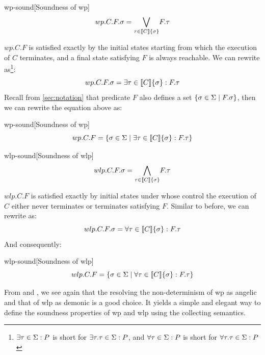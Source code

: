 \begin{theorem}{wp-sound}[Soundness of wp]~{\normalfont\cite{zhang22}} 
\ \vspace{-1.5mm}  
\[
wp.C.F.\sigma = \underset{\tau\in\sem{C}\{\sigma\}}{\bigvee} F.\tau
\]
\end{theorem}

$wp.C.F$ is satisfied exactly by the initial states starting from which the execution of $C$ terminates, and a final state satisfying $F$ is always reachable.
We can rewrite  as\footnote{$\exists\tau\in\S:P$ is short for $\exists\tau.\tau\in\S:P$, and $\forall\tau\in\S:P$ is short for $\forall\tau.\tau\in\S:P$}: 
\[wp.C.F.\sigma = \exists \tau\in\sem{C}\{\sigma\}: F.\tau \]
Recall from \autoref{sec:notation} that predicate $F$ also defines a set $\{\sigma\in\S\mid F.\sigma\}$, then we can rewrite the equation above as: 
\begin{corollary}{wp-sound}[Soundness of wp]
  \[wp.C.F = \{\sigma\in\S\mid\exists\tau\in\sem{C}\{\sigma\}:F.\tau\}\]
\end{corollary}

\begin{theorem}{wlp-sound}[Soundness of wlp]~{\normalfont\cite{zhang22, dijkstra90}}
\ \vspace{-1.5mm} 
\[
wlp.C.F.\sigma = \underset{\tau\in\sem{C}\{\sigma\}}{\bigwedge} F.\tau
\]
\end{theorem}
$wlp.C.F$ is satisfied exactly by initial states under whose control the execution of $C$ either never terminates or terminates satisfying $F$. 
Similar to before, we can rewrite  as: 
\[
  wlp.C.F.\sigma = \forall \tau\in\sem{C}\{\sigma\}: F.\tau
\]
And consequently: 
\begin{corollary}{wlp-sound}[Soundness of wlp]
\[
  wlp.C.F = \{ \sigma\in\S\mid \forall \tau\in\sem{C}\{\sigma\}: F.\tau\}
\]  
\end{corollary}

From  and , we see again that the resolving the non-determinism of wp as angelic and that of wlp as demonic is a good choice. 
It yields a simple and elegant way to define the soundness properties of wp and wlp using the collecting semantics. %

